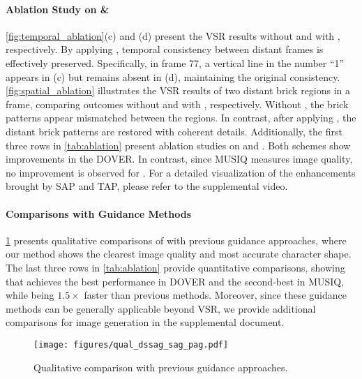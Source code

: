\paragraph{Ablation Study on {\tfiabb} \& {\ssiabb}} 
\cref{fig:temporal_ablation}(c) and (d) present the VSR results without and with {\tfiabb}, respectively. By applying {\tfiabb}, temporal consistency between distant frames is effectively preserved. Specifically, in frame 77, a vertical line in the number ``1'' appears in (c) but remains absent in (d), maintaining the original consistency. 
\cref{fig:spatial_ablation} illustrates the VSR results of two distant brick regions in a frame, comparing outcomes without and with {\ssiabb}, respectively. Without {\ssiabb}, the brick patterns appear mismatched between the regions. In contrast, after applying {\ssiabb}, the distant brick patterns are restored with coherent details.
Additionally, the first three rows in \cref{tab:ablation} present ablation studies on {\ssiabb} and {\tfiabb}. Both schemes show improvements in the DOVER. In contrast, since MUSIQ measures image quality, no improvement is observed for {\tfiabb}. For a detailed visualization of the enhancements brought by SAP and TAP, please refer to the supplemental video.

\paragraph{Comparisons with Guidance Methods}
\cref{fig:ablation_dssag} presents qualitative comparisons of {\drgabb} with previous guidance approaches, where our method shows the clearest image quality and most accurate character shape.
The last three rows in \cref{tab:ablation} provide quantitative comparisons, showing that {\drgabb} achieves the best performance in DOVER and the second-best in MUSIQ, while being $1.5\times$ faster than previous methods. Moreover, since these guidance methods can be generally applicable beyond VSR, we provide additional comparisons for image generation in the supplemental document.



\begin{figure}[t]
    \centering
    \texttt{[image: figures/qual\_dssag\_sag\_pag.pdf]}
    \vspace{-2mm} 
    \caption{Qualitative comparison with previous guidance approaches.
    }
    \vspace{-3mm}
    \label{fig:ablation_dssag}
\end{figure}